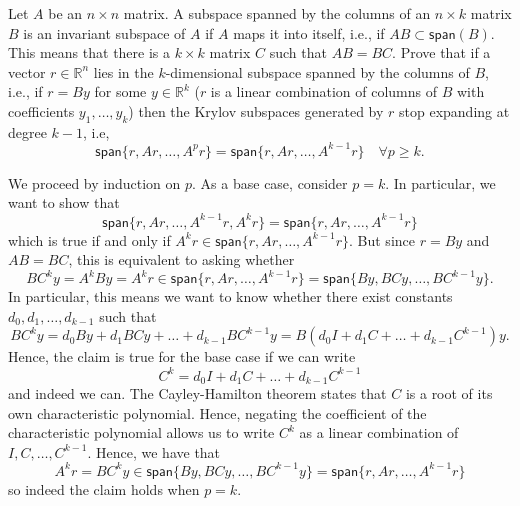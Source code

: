 \documentclass{../../../kin_math}
\begin{document}
\begin{questions}
  \question Let $A$ be an $n \times n$ matrix. A subspace spanned by the columns of an $n \times k$ matrix $B$ is an invariant subspace of $A$ if $A$ maps it into itself, i.e., if $AB \subset \textsf{span}(B)$. This means that there is a $k \times k$ matrix $C$ such that $AB = BC$. Prove that if a vector $r \in \mathbb{R}^n$ lies in the $k$-dimensional subspace spanned by the columns of $B$, i.e., if $r = By$ for some $y \in \mathbb{R}^k$ ($r$ is a linear combination of columns of $B$ with coefficients $y_1, \dots, y_k$) then the Krylov subspaces generated by $r$ stop expanding at degree $k - 1$,
  i.e,
  \begin{equation}
    \textsf{span}\{r, Ar, \dots, A^p r\} = \textsf{span}\{r, Ar, \dots, A^{k - 1} r\} \quad \forall p \geq k.
  \end{equation}
  \begin{solution}
    We proceed by induction on $p$. As a base case, consider $p = k$. In particular, we want to show that
    \begin{equation*}
      \textsf{span}\{r, Ar, \dots, A^{k - 1} r, A^k r\} = \textsf{span}\{r, Ar, \dots, A^{k - 1} r\}
    \end{equation*}
    which is true if and only if $A^k r \in \textsf{span}\{r, Ar, \dots, A^{k - 1} r\}$. But since $r = By$ and $AB = BC$, this is equivalent to asking whether
    \begin{equation*}
     BC^k y = A^k B y = A^k r \in \textsf{span}\{r, Ar, \dots, A^{k - 1} r\} = \textsf{span}\{By, BCy, \dots, BC^{k - 1} y\}.
    \end{equation*}
    In particular, this means we want to know whether there exist constants $d_0, d_1, \dots, d_{k - 1}$ such that
    \begin{equation*}
      BC^k y = d_0 By + d_1 BC y + \dots + d_{k - 1} B C^{k - 1} y = B(d_0 I + d_1 C + \dots + d_{k - 1} C^{k - 1})y.
    \end{equation*}
    Hence, the claim is true for the base case if we can write
    \begin{equation*}
      C^k = d_0 I + d_1 C + \dots + d_{k - 1} C^{k - 1}
    \end{equation*}
    and indeed we can. The Cayley-Hamilton theorem states that $C$ is a root of its own characteristic polynomial. Hence, negating the coefficient of the characteristic polynomial allows us to write $C^k$ as a linear combination of $I, C, \dots, C^{k - 1}$. Hence, we have that
    \begin{equation*}
      A^k r = BC^k y \in \textsf{span}\{By, BCy, \dots, BC^{k - 1} y\} = \textsf{span}\{r, Ar, \dots, A^{k - 1} r\}
    \end{equation*}
    so indeed the claim holds when $p = k$.


\end{solution}
\end{questions}
\end{document}
